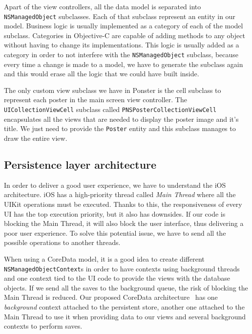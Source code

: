 Apart of the view controllers, all the data model is separated into
\texttt{NSManaged\-Object} subclasses. Each of that subclass represent an entity in
our model. Business logic is usually implemented as a category of each of the model
subclass. Categories in Objective-C are capable of adding methods to any object
without having to change its implementations. This logic is usually added as a
category in order to not interfere with the \texttt{NSManagedObject} subclass,
because every time a change is made to a model, we have to generate the subclass
again and this would erase all the logic that we could have built inside.

The only custom view subclass we have in Ponster is the cell subclass to
represent each poster in the main screen view controller. The
\texttt{UI\-Collection\-View\-Cell} subclass called \texttt{PNSPoster\-Collection\-View\-Cell}
encapsulates all the views that are needed to display the poster image and it's
title. We just need to provide the \texttt{Poster} entity and this subclass manages
to draw the entire view.

\subsection{Persistence layer architecture}
\label{sec:persistency}
In order to deliver a good user experience, we have to understand the iOS
architecture. iOS has a high-priority thread called \emph{Main Thread} where all the
UIKit operations must be executed. Thanks to this, the responsiveness of every UI
has the top execution priority, but it also has downsides. If our code is blocking
the Main Thread, it will also block the user interface, thus delivering a poor user
experience. To solve this potential issue, we have to send all the possible
operations to another threads.

When using a CoreData model, it is a good idea to create different
\texttt{NSManaged\-Object\-Context}s in order to have contexts using background threads
and one context tied to the UI code to provide the views with the database
objects. If we send all the saves to the background queue, the risk of blocking the
Main Thread is reduced. Our proposed CoreData architecture~\cite{coredataarch} has
one \emph{background} context attached to the persistent store, another one attached
to the Main Thread to use it when providing data to our views and several background
contexts to perform saves.

